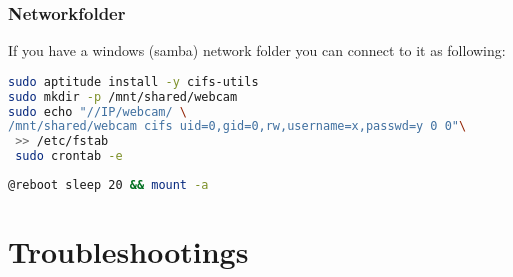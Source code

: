 \documentclass[german,a4paper,11pt]{report}
\begin{document}
\subsection{Networkfolder}
If you have a windows (samba) network folder you can connect to it as following:
\begin{lstlisting}[language=bash,caption={}]
sudo aptitude install -y cifs-utils
sudo mkdir -p /mnt/shared/webcam
sudo echo "//IP/webcam/ \
/mnt/shared/webcam cifs uid=0,gid=0,rw,username=x,passwd=y 0 0"\
 >> /etc/fstab
 sudo crontab -e
\end{lstlisting}
\begin{lstlisting}[language=bash,caption={cronjob}]
@reboot	sleep 20 && mount -a
\end{lstlisting}

\chapter{Troubleshootings}
\end{document}
